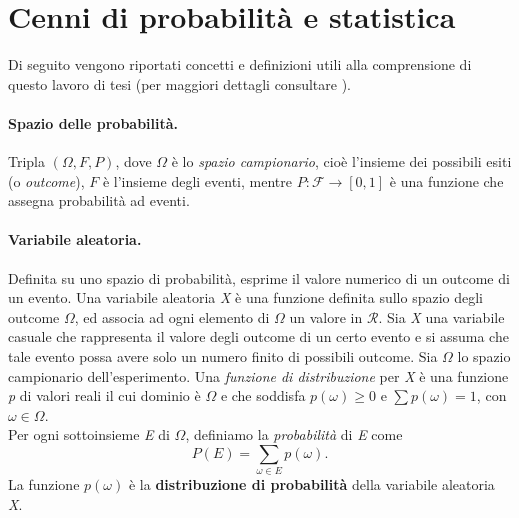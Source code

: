 \section{Cenni di probabilità e statistica}
Di seguito vengono riportati concetti e definizioni utili alla comprensione di questo lavoro di tesi (per maggiori dettagli consultare \cite{grinstead2012introduction}).\\
\paragraph{Spazio delle probabilità.} Tripla $(\Omega, F, P)$, dove $\Omega$ è lo \textit{spazio campionario}, cioè l'insieme dei possibili esiti (o \textit{outcome}), $F$ è l'insieme degli eventi, mentre $P : \mathcal{F} \rightarrow [0, 1]$ è una funzione che assegna probabilità ad eventi.\\
\paragraph{Variabile aleatoria.} Definita su uno spazio di probabilità, esprime il valore numerico di un outcome di un evento. Una variabile aleatoria \textit{X} è una funzione definita sullo spazio degli outcome $\Omega$, ed associa ad ogni elemento di $\Omega$ un valore in $\mathcal{R}$.
Sia \textit{X} una variabile casuale che rappresenta il valore degli outcome di un certo evento e si assuma che tale evento possa avere solo un numero finito di possibili outcome. Sia $\Omega$ lo spazio campionario dell'esperimento. Una \textit{funzione di distribuzione} per \textit{X} è una funzione \textit{p} di valori reali il cui dominio è $\Omega$ e che soddisfa $p(\omega) \geq 0$ e $\sum{p(\omega)} = 1$, con $\omega \in \Omega$.\\
Per ogni sottoinsieme \textit{E} di $\Omega$, definiamo la \textit{probabilità} di \textit{E} come
\begin{equation}
	P(E) = \sum_{\omega \in E}{p(\omega)}.
\end{equation}
La funzione $p(\omega)$ è la \textbf{distribuzione di probabilità} della variabile aleatoria \textit{X}.
